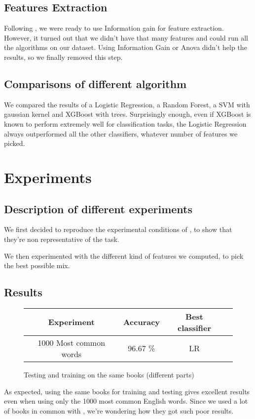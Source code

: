 \documentclass[10pt]{article}
\begin{document}
\subsection{Features Extraction}
Following \cite{Parse}, we were ready to use Information gain for feature extraction. However, it turned out that we didn't have that many features and could run all the algorithms on our dataset. Using Information Gain or Anova didn't help the results, so we finally removed this step.

\subsection{Comparisons of different algorithm}
We compared the results of a Logistic Regression, a Random Forest, a SVM with gaussian kernel and XGBoost with trees. Surprisingly enough, even if XGBoost is known to perform extremely well for classification tasks, the Logistic Regression always outperformed all the other classifiers, whatever number of features we picked.

\section{Experiments}
\subsection{Description of different experiments}
We first decided to reproduce the experimental conditions of \cite{homemade}, to show that they're non representative of the task.


We then experimented with the different kind of features we computed, to pick the best possible mix.

\subsection{Results}
\begin{figure}[h]
\centering\begin{tabular}{|c|c|c|c|}
\hline 
Experiment & Accuracy & Best classifier\\
\hline 
1000 Most common words & 96.67 \% & LR \\
\hline
\end{tabular}
\caption{Testing and training on the same books (different parts)}
\end{figure}
As expected, using the same books for training and testing gives excellent results even when using only the 1000 most common English words. Since we used a lot of books in common with \cite{homemade}, we're wondering how they got such poor results.
\end{document}
